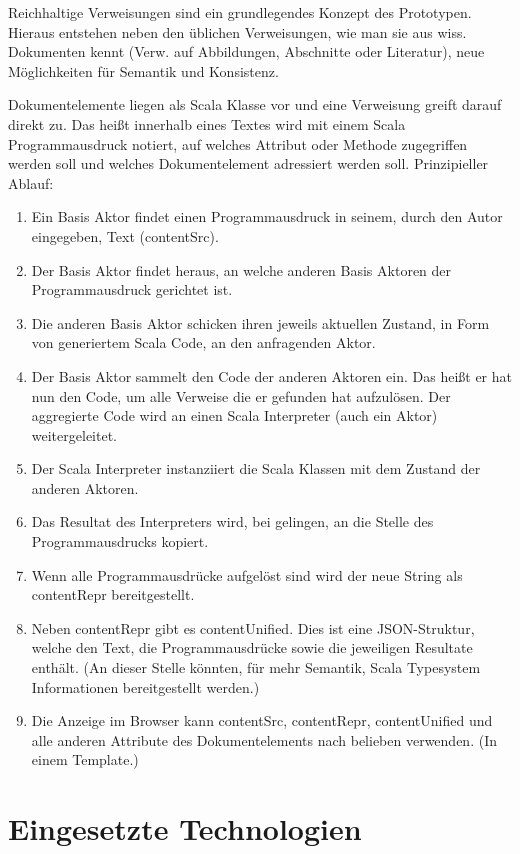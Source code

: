 Reichhaltige Verweisungen sind ein grundlegendes Konzept des Prototypen. Hieraus entstehen neben den üblichen Verweisungen, wie man sie aus wiss. Dokumenten kennt (Verw. auf Abbildungen, Abschnitte oder Literatur), neue Möglichkeiten für Semantik und Konsistenz.

 
Dokumentelemente liegen als Scala Klasse vor und eine Verweisung greift darauf direkt zu. Das heißt innerhalb eines Textes wird mit einem Scala Programmausdruck notiert, auf welches Attribut oder Methode zugegriffen werden soll und welches Dokumentelement adressiert werden soll. Prinzipieller Ablauf:

 
\begin{enumerate}

\item Ein Basis Aktor findet einen Programmausdruck in seinem, durch den Autor eingegeben, Text (contentSrc).
\item Der Basis Aktor findet heraus, an welche anderen Basis Aktoren der Programmausdruck gerichtet ist.
\item Die anderen Basis Aktor schicken ihren jeweils aktuellen Zustand, in Form von generiertem Scala Code, an den anfragenden Aktor.
\item Der Basis Aktor sammelt den Code der anderen Aktoren ein. Das heißt er hat nun den Code, um alle Verweise die er gefunden hat aufzulösen. Der aggregierte Code wird an einen Scala Interpreter (auch ein Aktor) weitergeleitet.
\item Der Scala Interpreter instanziiert die Scala Klassen mit dem Zustand der anderen Aktoren.
\item Das Resultat des Interpreters wird, bei gelingen, an die Stelle des Programmausdrucks kopiert.
\item Wenn alle Programmausdrücke aufgelöst sind wird der neue String als contentRepr bereitgestellt.
\item Neben contentRepr gibt es contentUnified. Dies ist eine JSON-Struktur, welche den Text, die Programmausdrücke sowie die jeweiligen Resultate enthält. (An dieser Stelle könnten, für mehr Semantik, Scala Typesystem Informationen bereitgestellt werden.)
\item Die Anzeige im Browser kann contentSrc, contentRepr, contentUnified und alle anderen Attribute des Dokumentelements nach belieben verwenden. (In einem Template.)
\end{enumerate}
 
\section{Eingesetzte Technologien}\label{}
 
